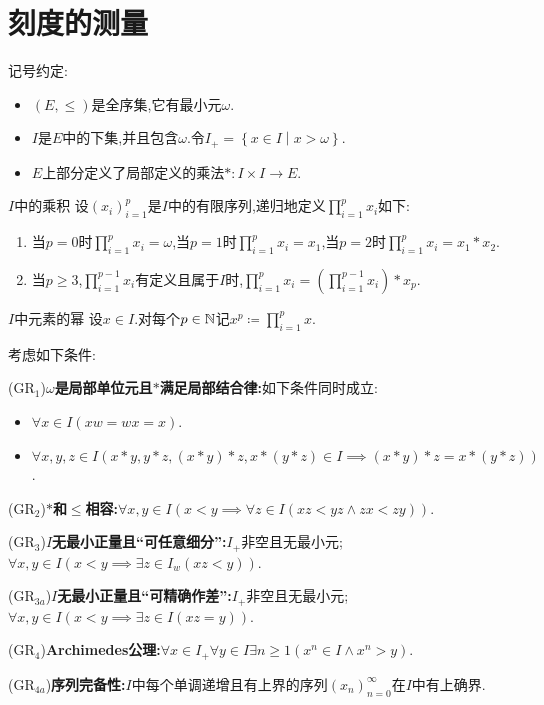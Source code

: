 \chapter{刻度的测量}

记号约定:
\begin{itemize}
	\item $\left(E,\leq\right)$是全序集,它有最小元$\omega$.
	\item $I$是$E$中的下集,并且包含$\omega$.令$I_{+}=\left\{x\in I\middle|x>\omega\right\}$.
	\item $E$上部分定义了局部定义的乘法$\ast:I\times I\to E$.
\end{itemize}

\begin{definition}{$I$中的乘积}{}
	设$\left(x_{i}\right)_{i=1}^{p}$是$I$中的有限序列,递归地定义$\prod\limits_{i=1}^{p}x_{i}$如下:
	\begin{enumerate}
		\item 当$p=0$时$\prod\limits_{i=1}^{p}x_{i}=\omega$,当$p=1$时$\prod\limits_{i=1}^{p}x_{i}=x_{1}$,当$p=2$时$\prod\limits_{i=1}^{p}x_{i}=x_{1}\ast x_{2}$.
		\item 当$p\geq 3$,$\prod\limits_{i=1}^{p-1}x_{i}$有定义且属于$I$时,$\prod\limits_{i=1}^{p}x_{i}=\left(\prod\limits_{i=1}^{p-1}x_{i}\right)\ast x_{p}$.
	\end{enumerate}
\end{definition}

\begin{definition}{$I$中元素的幂}{}
	设$x\in I$.对每个$p\in\mathbb{N}$记$x^{p}\coloneq\prod\limits_{i=1}^{p}x$.
\end{definition}

考虑如下条件:
\begin{description}
	\item ($\mathrm{GR}_{1}$)\textbf{$\omega$是局部单位元且$\ast$满足局部结合律:}如下条件同时成立:
	\begin{itemize}
		\item $\forall x\in I\left(xw=wx=x\right)$.
		\item $\forall x,y,z\in I\left(x\ast y,y\ast z,\left(x\ast y\right)\ast z,x\ast\left(y\ast z\right)\in I\implies\left(x\ast y\right)\ast z=x\ast\left(y\ast z\right)\right)$.
	\end{itemize}
	\item ($\mathrm{GR}_{2}$)\textbf{$\ast$和$\leq$相容:}$\forall x,y\in I\left(x<y\implies \forall z\in I\left(xz<yz\wedge zx<zy\right)\right)$.
	\item ($\mathrm{GR}_{3}$)\textbf{$I$无最小正量且``可任意细分'':}$I_{+}$非空且无最小元;$\forall x,y\in I\left(x<y\implies\exists z\in I_{w}\left(xz<y\right)\right)$.
	\item ($\mathrm{GR}_{3a}$)\textbf{$I$无最小正量且``可精确作差'':}$I_{+}$非空且无最小元;$\forall x,y\in I\left(x<y\implies\exists z\in I\left(xz=y\right)\right)$.
	\item ($\mathrm{GR}_{4}$)\textbf{Archimedes公理:}$\forall x\in I_{+}\forall y\in I\exists n\geq 1\left(x^{n}\in I\wedge x^{n}>y\right)$.
	\item ($\mathrm{GR}_{4a}$)\textbf{序列完备性:}$I$中每个单调递增且有上界的序列$\left(x_{n}\right)_{n=0}^{\infty}$在$I$中有上确界.
\end{description}

